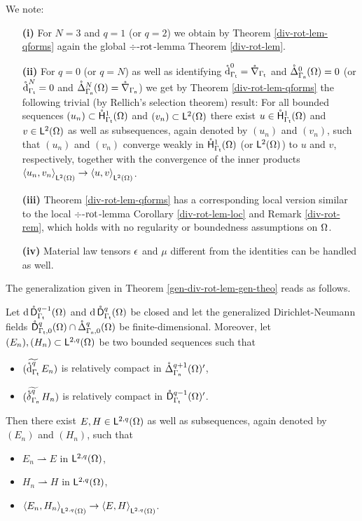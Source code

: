 \documentclass[a4paper]{amsart}
\newcommand{\wto}{\rightharpoonup}
\renewcommand{\dc}{\mathring\dsymbol}
\renewcommand{\dcgat}{\dc_{\gat}}
\newcommand{\grad}{\na}
\newcommand{\gradc}{\mathring\grad}
\begin{document}
\begin{rem}
We note:
\begin{itemize}
\item[\bf(i)]
For $N=3$ and $q=1$ (or $q=2$) we obtain by Theorem \ref{div-rot-lem-qforms}
again the global $\div$-$\operatorname{rot}$-lemma Theorem \ref{div-rot-lem}.
\item[\bf(ii)]
For $q=0$ (or $q=N$) 
as well as identifying $\mathring\ed_{\gat}^{0}=\gradc_{\gat}$ 
and $\mathring\Delta^{0}_{\Gamma_{\mathsf{n}}}(\Omega)=0$
(or $\mathring{\operatorname{d}}_{\Gamma_{\mathsf{t}}}^{N}=0$ 
and $\mathring\Delta^{N}_{\gan}(\om)=\gradc_{\gan}$)
we get by Theorem \ref{div-rot-lem-qforms} 
the following trivial (by Rellich's selection theorem) result:
For all bounded sequences 
$(u_{n})\subset\mathring{\mathsf{H}}^{1}_{\Gamma_{\mathsf{t}}}(\Omega)$ and $(v_{n})\subset\overset{}{\mathsf{L}}{}^{2}_{}(\Omega)$
there exist $u\in\mathring{\mathsf{H}}^{1}_{\Gamma_{\mathsf{t}}}(\Omega)$ and $v\in\overset{}{\mathsf{L}}{}^{2}_{}(\Omega)$
as well as subsequences, again denoted by $(u_{n})$ and $(v_{n})$, 
such that $(u_{n})$ and $(v_{n})$ converge weakly in $\mathring{\mathsf{H}}^{1}_{\Gamma_{\mathsf{t}}}(\Omega)$ (or $\overset{}{\mathsf{L}}{}^{2}_{}(\Omega)$)
to $u$ and $v$, respectively, together with the convergence of the inner products
$\langle u_{n},v_{n}\rangle_{\overset{}{\mathsf{L}}{}^{2}_{}(\Omega)}\to\langle u,v\rangle_{\overset{}{\mathsf{L}}{}^{2}_{}(\Omega)}$.
\item[\bf(iii)]
Theorem \ref{div-rot-lem-qforms} has a corresponding local version similar to 
the local $\div$-$\operatorname{rot}$-lemma Corollary \ref{div-rot-lem-loc} and Remark \ref{div-rot-rem}, 
which holds with no regularity or boundedness assumptions on $\Omega$.
\item[\bf(iv)]
Material law tensors $\epsilon$ and $\mu$ different from the identities can be handled as well.
\end{itemize}
\end{rem}

The generalization given in Theorem \ref{gen-div-rot-lem-gen-theo} reads as follows.

\begin{theo}
Let $\ed\dcgat^{q-1}(\om)$ and $\ed\dcgat^{q}(\om)$ be closed and let the generalized Dirichlet-Neumann fields
$\mathring{\mathsf{D}}^{q}_{\Gamma_{\mathsf{t}},0}(\Omega)\cap\mathring\Delta^{q}_{\Gamma_{\mathsf{n}},0}(\Omega)$ be finite-dimensional.
Moreover, let $(E_{n}),(H_{n})\subset\overset{}{\mathsf{L}}{}^{2,q}_{}(\Omega)$ be two bounded sequences such that
\begin{itemize}
\item
$(\widetilde{\mathring{\operatorname{d}}_{\Gamma_{\mathsf{t}}}^{q}}\,E_{n})$ is relatively compact in $\mathring\Delta^{q+1}_{\Gamma_{\mathsf{n}}}(\Omega)'$,
\item
$(\widetilde{\mathring{\operatorname{\delta}}_{\Gamma_{\mathsf{n}}}^{q}}\,H_{n})$ is relatively compact in $\dcgat^{q-1}(\om)'$.
\end{itemize}
Then there exist $E,H\in\overset{}{\mathsf{L}}{}^{2,q}_{}(\Omega)$ as well as subsequences, again denoted by $(E_{n})$ and $(H_{n})$, 
such that
\begin{itemize}
\item
$E_{n}\wto E$ in $\overset{}{\mathsf{L}}{}^{2,q}_{}(\Omega)$,
\item
$H_{n}\wto H$ in $\overset{}{\mathsf{L}}{}^{2,q}_{}(\Omega)$,
\item
$\langle E_{n},H_{n}\rangle_{\overset{}{\mathsf{L}}{}^{2,q}_{}(\Omega)}\to\langle E,H\rangle_{\overset{}{\mathsf{L}}{}^{2,q}_{}(\Omega)}$.
\end{itemize}
\end{theo}
\end{document}
